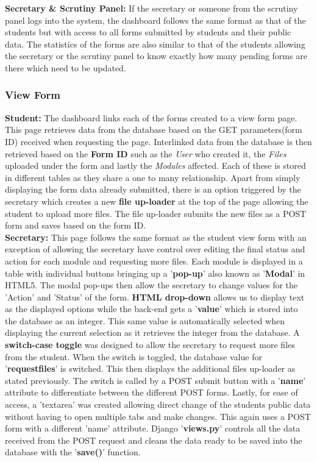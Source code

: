 \documentclass[../main.tex]{subfiles}
\begin{document}
\textbf{Secretary \& Scrutiny Panel:} If the secretary or someone from the scrutiny panel logs into the system, the dashboard follows the same format as that of the students but with access to all forms submitted by students and their public data. The statistics of the forms are also similar to that of the students allowing the secretary or the scrutiny panel to know exactly how many pending forms are there which need to be updated. 

\subsubsection{View Form} 

\textbf{Student:} The dashboard links each of the forms created to a view form page. This page retrieves data from the database based on the GET parameters(form ID) received when requesting the page. Interlinked data from the database is then retrieved based on the \textbf{Form ID} such as the \textit{User} who created it, the \textit{Files} uploaded under the form and lastly the \textit{Modules} affected. Each of these is stored in different tables as they share a one to many relationship. Apart from simply displaying the form data already submitted, there is an option triggered by the secretary which creates a new \textbf{file up-loader} at the top of the page allowing the student to upload more files. The file up-loader submits the new files as a POST form and saves based on the form ID. \\[4mm]

\textbf{Secretary:} This page follows the same format as the student view form with an exception of allowing the secretary have control over editing the final status and action for each module and requesting more files. Each module is displayed in a table with individual buttons bringing up a '\textbf{pop-up}' also known as '\textbf{Modal}' in HTML5. The modal pop-ups then allow the secretary to change values for the 'Action' and 'Status' of the form. \textbf{HTML drop-down} allows us to display text as the displayed options while the back-end gets a '\textbf{value}' which is stored into the database as an integer. This same value is automatically selected when displaying the current selection as it retrieves the integer from the database. A \textbf{switch-case toggle} was designed to allow the secretary to request more files from the student. When the switch is toggled, the database value for '\textbf{requestfiles}' is switched. This then displays the additional files up-loader as stated previously. The switch is called by a POST submit button with a '\textbf{name}' attribute to differentiate between the different POST forms. Lastly, for ease of access, a 'textarea' was created allowing direct change of the students public data without having to open multiple tabs and make changes. This again uses a POST form with a different 'name' attribute. Django '\textbf{views.py}' controls all the data received from the POST request and cleans the data ready to be saved into the database with the '\textbf{save()}' function. \\[4mm]
\end{document}
